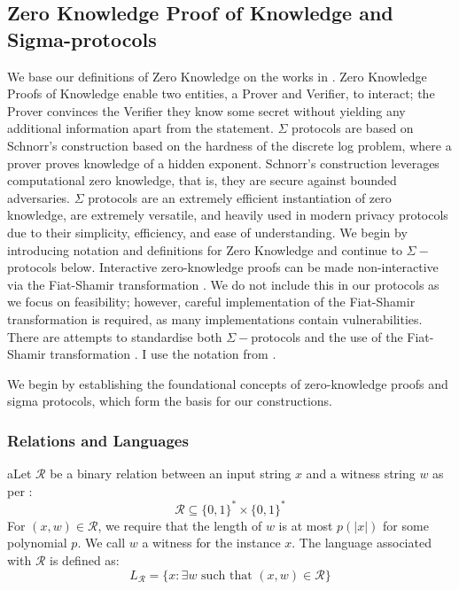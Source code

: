 \subsection{Zero Knowledge Proof of Knowledge and Sigma-protocols}\label{def:zeroknowledgeproofofoknowledge}
We base our definitions of Zero Knowledge on the works in \cite{goldreich_foundations_2007, goldwasser_knowledge_1985, DBLP:conf/crypto/BellareG92}.
Zero Knowledge \cite{goldwasser_knowledge_1985} Proofs of Knowledge \cite{DBLP:conf/crypto/BellareG92} enable two entities, a Prover and Verifier, to interact; the Prover convinces the Verifier they know some secret without yielding any additional information apart from the statement. $\Sigma$ protocols are based on Schnorr's construction \cite{schnorr_efficient_1991} based on the hardness of the discrete log problem, where a prover proves knowledge of a hidden exponent. Schnorr's construction leverages computational zero knowledge, that is, they are secure against bounded adversaries. $\Sigma$ protocols are an extremely efficient instantiation of zero knowledge, are extremely versatile, and heavily used in modern privacy protocols due to their simplicity, efficiency, and ease of understanding. We begin by introducing notation and definitions for Zero Knowledge and continue to $\Sigma-$protocols below. Interactive zero-knowledge proofs can be made non-interactive via the Fiat-Shamir transformation \cite{odlyzko_how_1986}. We do not include this in our protocols as we focus on feasibility; however, careful implementation of the Fiat-Shamir transformation is required, as many implementations contain vulnerabilities. There are attempts to standardise both $\Sigma-$protocols and the use of the Fiat-Shamir transformation \cite{stephan_krenn_proposal_2021}. I use the notation from \cite{DBLP:conf/eurocrypt/CamenischM99}. 


We begin by establishing the foundational concepts of zero-knowledge proofs and sigma protocols, which form the basis for our constructions.

\subsubsection{Relations and Languages}

\begin{definition}[Relation]
\label{def:relation}
aLet $\mathcal{R}$ be a binary relation between an input string $x$ and a witness string $w$ as per \cite{DBLP:conf/crypto/BellareG92, feige_zero-knowledge_1988}:
$$\mathcal{R} \subseteq \{0,1\}^* \times \{0,1\}^*$$
For $(x,w) \in \mathcal{R}$, we require that the length of $w$ is at most $p(|x|)$ for some polynomial $p$. We call $w$ a witness for the instance $x$. The language associated with $\mathcal{R}$ is defined as:
$$L_\mathcal{R} = \{x : \exists w \text{ such that } (x,w) \in \mathcal{R}\}$$
\end{definition}

